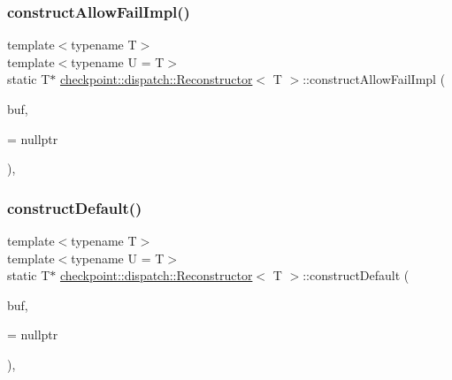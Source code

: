 \subsubsection{\texorpdfstring{construct\+Allow\+Fail\+Impl()}{constructAllowFailImpl()}\hspace{0.1cm}{\footnotesize\ttfamily [2/2]}}
{\footnotesize\ttfamily template$<$typename T$>$ \\
template$<$typename U  = T$>$ \\
static T$\ast$ \hyperlink{structcheckpoint_1_1dispatch_1_1_reconstructor}{checkpoint\+::dispatch\+::\+Reconstructor}$<$ T $>$\+::construct\+Allow\+Fail\+Impl (\begin{DoxyParamCaption}\item[{void $\ast$}]{buf,  }\item[{\hyperlink{structcheckpoint_1_1dispatch_1_1_reconstructor_a6220795c08856d2f0d86f1659647e2f0}{is\+Not\+Constructible}$<$ U $>$ $\ast$}]{ = {\ttfamily nullptr} }\end{DoxyParamCaption})\hspace{0.3cm}{\ttfamily [inline]}, {\ttfamily [static]}}

\mbox{\label{structcheckpoint_1_1dispatch_1_1_reconstructor_af09a6d0312dbed7c8a311350b689794d}} 
\subsubsection{\texorpdfstring{construct\+Default()}{constructDefault()}\hspace{0.1cm}{\footnotesize\ttfamily [1/2]}}
{\footnotesize\ttfamily template$<$typename T$>$ \\
template$<$typename U  = T$>$ \\
static T$\ast$ \hyperlink{structcheckpoint_1_1dispatch_1_1_reconstructor}{checkpoint\+::dispatch\+::\+Reconstructor}$<$ T $>$\+::construct\+Default (\begin{DoxyParamCaption}\item[{void $\ast$}]{buf,  }\item[{\hyperlink{structcheckpoint_1_1dispatch_1_1_reconstructor_ae91135a7a24b1008e7f184271fbc35d8}{is\+Default\+Cons\+Type}$<$ U $>$ $\ast$}]{ = {\ttfamily nullptr} }\end{DoxyParamCaption})\hspace{0.3cm}{\ttfamily [inline]}, {\ttfamily [static]}}

